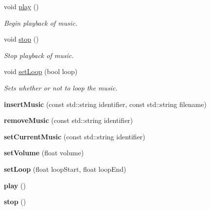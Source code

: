 \begin{DoxyCompactItemize}
\mbox{\label{classMusicHandler_a9fe6bb5dfce663a969309dd50893ce55}} 
void \mbox{\hyperlink{classMusicHandler_a9fe6bb5dfce663a969309dd50893ce55}{play}} ()
\begin{DoxyCompactList}\small\item\em Begin playback of music. \end{DoxyCompactList}\item 
\mbox{\label{classMusicHandler_aab1e90be1e7e585449091b3a6e1ad3bf}} 
void \mbox{\hyperlink{classMusicHandler_aab1e90be1e7e585449091b3a6e1ad3bf}{stop}} ()
\begin{DoxyCompactList}\small\item\em Stop playback of music. \end{DoxyCompactList}\item 
void \mbox{\hyperlink{classMusicHandler_a2c7a5bcc621e5912582ddf4efbe4d5a7}{set\+Loop}} (bool loop)
\begin{DoxyCompactList}\small\item\em Sets whether or not to loop the music. \end{DoxyCompactList}\item 
\mbox{\label{classMusicHandler_a426645f2f04b944270504c99703a0d16}} 
{\bfseries insert\+Music} (const std\+::string identifier, const std\+::string filename)
\item 
\mbox{\label{classMusicHandler_a7ee062f4bda087e4f2b8e72e72644cc0}} 
{\bfseries remove\+Music} (const std\+::string identifier)
\item 
\mbox{\label{classMusicHandler_acc2719ebc7b0a4f84ba787c83ea7b4fb}} 
{\bfseries set\+Current\+Music} (const std\+::string identifier)
\item 
\mbox{\label{classMusicHandler_a96614ccefe6082c95b66e192b79b6bc9}} 
{\bfseries set\+Volume} (float volume)
\item 
\mbox{\label{classMusicHandler_a3a89fd8c539db30895a6cad58ebb6c4a}} 
{\bfseries set\+Loop} (float loop\+Start, float loop\+End)
\item 
\mbox{\label{classMusicHandler_a12d3cbe75ece24d2420bb739883c3c82}} 
{\bfseries play} ()
\item 
\mbox{\label{classMusicHandler_abec4fe47f9941eabf11c77ce122cb437}} 
{\bfseries stop} ()
\end{DoxyCompactItemize}


